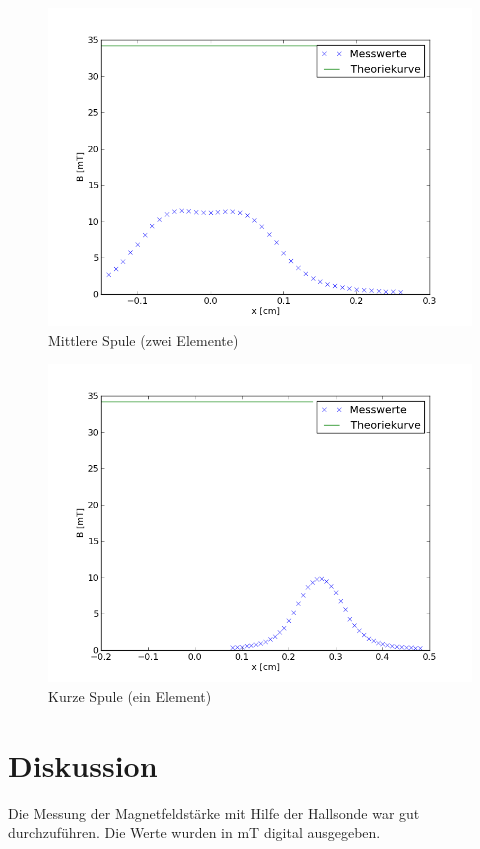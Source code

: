 \documentclass[11pt,ngerman,a4paper]{article}
\begin{document}
\begin{figure}[htp]
\centering
\includegraphics[scale=0.7]{e22.png}
\caption{Mittlere Spule (zwei Elemente)}
\label{hhspule}
\end{figure}

\begin{figure}[htp]
\centering
\includegraphics[scale=0.7]{e23.png}
\caption{Kurze Spule (ein Element)}
\label{plot6}
\end{figure}

\section{Diskussion}
Die Messung der Magnetfeldstärke mit Hilfe der Hallsonde war gut durchzuführen. Die Werte wurden in mT digital ausgegeben.
\newline
\end{document}
